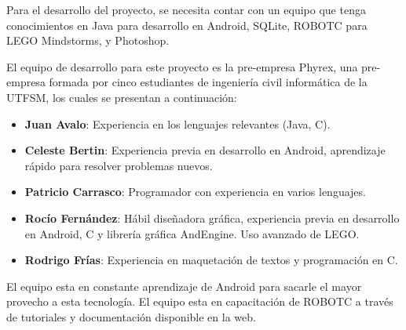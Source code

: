 Para el desarrollo del proyecto, se necesita contar con un equipo que tenga conocimientos en Java para desarrollo en Android, SQLite, ROBOTC para LEGO Mindstorms, y Photoshop. 

El equipo de desarrollo para este proyecto es la pre-empresa Phyrex, una pre-empresa formada por cinco estudiantes de ingenier\'ia civil inform\'atica de la UTFSM, los cuales se presentan a continuaci\'on:

\begin{itemize}
\item {\bf Juan Avalo}: Experiencia en los lenguajes relevantes (Java, C). 
\item {\bf Celeste Bertin}: Experiencia previa en desarrollo en Android, aprendizaje r\'apido para resolver problemas nuevos. 
\item {\bf Patricio Carrasco}: Programador con experiencia en varios lenguajes.
\item {\bf Roc\'io Fern\'andez}: H\'abil dise\~nadora gr\'afica, experiencia previa en desarrollo en Android, C y librer\'ia gr\'afica AndEngine. Uso avanzado de LEGO. 
\item {\bf Rodrigo Fr\'ias}: Experiencia en maquetaci\'on de textos y programaci\'on en C.
\end{itemize}

El equipo esta en constante aprendizaje de Android para sacarle el mayor provecho a esta tecnolog\'ia. El equipo esta en capacitaci\'on de ROBOTC a trav\'es de tutoriales y documentaci\'on disponible en la web. 
